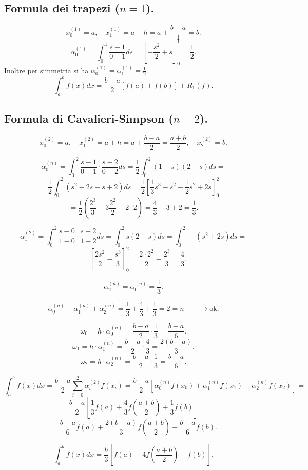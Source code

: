 \subsection{Formula dei trapezi ($n=1$).}
\[x_0^{(1)} = a, \quad x_1^{(1)} = a+h = a+ \frac{b-a}{1} = b.\]
\[\alpha_0^{(1)}= \int_0^1 \frac{s-1}{0-1}ds = \left[-\frac{s^2}{2} +s
\right]_0^1
= \frac{1}{2}.\]
Inoltre per simmetria si ha $\alpha_0^{(1)}=\alpha_1^{(1)} = \frac{1}{2}$.
\[\int_a^bf(x)dx = \frac{b-a}{2}[f(a)+f(b)] + R_1(f).\]


\subsection{Formula di Cavalieri-Simpson ($n=2$).}
\[x_0^{(2)} = a, \quad x_1^{(2)} = a+h = a+ \frac{b-a}{2} = \frac{a+b}{2},
\quad x_2^{(2)} = b.\]

\[\alpha_0^{(n)}=
\int_0^2 \frac{s-1}{0-1} \cdot \frac{s-2}{0-2}ds =
\frac{1}{2} \int_0^2(1-s)(2-s)ds = 
\]
\[= 
\frac{1}{2} \int_0^2(s^2-2s-s+2)ds = \frac{1}{2}\left[
\frac{1}{3}s^3 - s^2 -\frac{1}{2}s^2 +2s\right]_0^2 =
\]
\[=\frac{1}{2}\left(
\frac{2^3}{3} - 3 \frac{2^2}{2} + 2\cdot 2\right) = \frac{4}{3} -3 +2 =
\frac{1}{3}.
\]

\[\alpha_1^{(2)} =
\int_0^2 \frac{s-0}{1-0} \cdot \frac{s-2}{1-2}ds =
\int_0^2 s(2-s)ds = \int_0^2-(s^2+2s) ds =
\]
\[=
\left[\frac{2s^2}{2} - \frac{s^3}{3}\right]_0^2 = 
\frac{2 \cdot2^2}{2} - \frac{2^3}{3} = \frac{4}{3}.
\]

\[\alpha_2^{(n)} = \alpha_0^{(n)}= \frac{1}{3}.\]

\[\alpha_0^{(n)} +\alpha_1^{(n)} + \alpha_2^{(n)} = \frac{1}{3} + \frac{4}{3} + 
\frac{1}{3} = 2
= n \qquad \rightarrow \textrm{ok.}\]

\[
\omega_0 = h \cdot \alpha_0^{(n)} = \frac{b-a}{2}\cdot \frac{1}{3} = \frac{b-a}{6}.
\]
\[
\omega_1 = h\cdot \alpha_1^{(n)} = \frac{b-a}{2}\cdot\frac{4}{3} =\frac{2(b-a)}{3}.
\]
\[
\omega_2 = h \cdot \alpha_2^{(n)} = \frac{b-a}{2}\cdot \frac{1}{3} = \frac{b-a}{6}.
\]

\[
\int_a^bf(x)dx = \frac{b-a}{2} \sum_{i=0}^2\alpha_i^{(2)} f(x_i) = \frac{b-a}{2}
\left[\alpha_0^{(n)} f(x_0)+ \alpha_1^{(n)} f(x_1)+\alpha_2^{(n)} f(x_2)\right]=\]
\[=
\frac{b-a}{2}\left[
\frac{1}{3} f(a)+ \frac{4}{3}f\left(\frac{a+b}{2}\right) + \frac{1}{3}
f(b)\right]=\]
\[=\frac{b-a}{6}f(a) + \frac{2(b-a)}{3}f\left(\frac{a+b}{2}\right)+
\frac{b-a}{6}f(b).
\]

\[
\int_a^bf(x)dx = \frac{h}{3}\left[f(a)+4f\left(\frac{a+b}{2}\right)
+ f(b)\right].
\]


